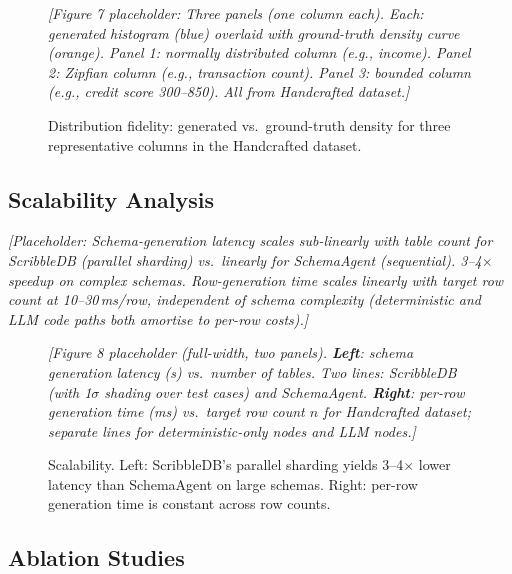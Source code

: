 \begin{figure}[t]
  \centering
  \vspace{1.5cm}
  \textit{[Figure 7 placeholder: Three panels (one column each).
  Each: generated histogram (blue) overlaid with ground-truth density curve (orange).
  Panel 1: normally distributed column (e.g., income).
  Panel 2: Zipfian column (e.g., transaction count).
  Panel 3: bounded column (e.g., credit score 300--850).
  All from Handcrafted dataset.]}
  \vspace{1.5cm}
  \caption{Distribution fidelity: generated vs.\ ground-truth density for three representative
           columns in the Handcrafted dataset.}
  \label{fig:distributions}
\end{figure}

\subsection{Scalability Analysis}
\label{subsec:scalability}

\textit{[Placeholder: Schema-generation latency scales sub-linearly with table count for
ScribbleDB (parallel sharding) vs.\ linearly for SchemaAgent (sequential).
3--4$\times$ speedup on complex schemas.
Row-generation time scales linearly with target row count at 10--30\,ms/row,
independent of schema complexity (deterministic and LLM code paths both amortise
to per-row costs).]}

\begin{figure}[t]
  \centering
  \vspace{1.5cm}
  \textit{[Figure 8 placeholder (full-width, two panels).
  \textbf{Left}: schema generation latency (s) vs.\ number of tables.
  Two lines: ScribbleDB (with 1$\sigma$ shading over test cases) and SchemaAgent.
  \textbf{Right}: per-row generation time (ms) vs.\ target row count $n$
  for Handcrafted dataset; separate lines for deterministic-only nodes and LLM nodes.]}
  \vspace{1.5cm}
  \caption{Scalability. Left: ScribbleDB's parallel sharding yields 3--4$\times$ lower
           latency than SchemaAgent on large schemas.
           Right: per-row generation time is constant across row counts.}
  \label{fig:scalability}
\end{figure}

\subsection{Ablation Studies}
\label{subsec:ablation}

